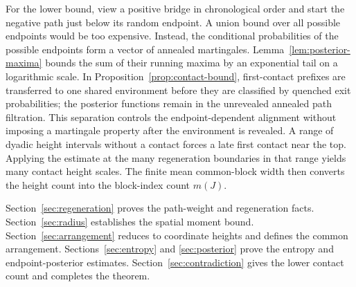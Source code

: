For the lower bound, view a positive bridge in chronological order and
start the negative path just below its random endpoint. A union bound
over all possible endpoints would be too expensive. Instead, the
conditional probabilities of the possible endpoints form a vector of
annealed martingales. Lemma~\ref{lem:posterior-maxima} bounds the sum of
their running maxima by an exponential tail on a logarithmic scale.
In Proposition~\ref{prop:contact-bound}, first-contact prefixes are transferred to
one shared environment before they are classified by quenched exit
probabilities; the posterior functions remain in the unrevealed
annealed path filtration. This separation controls the endpoint-dependent
alignment without imposing a martingale property after the environment
is revealed. A range of dyadic height intervals without a contact forces
a late first contact near the top. Applying the estimate at the many
regeneration boundaries in that range yields many contact height scales.
The finite mean common-block width then converts the height
count into the block-index count $m(J)$.

Section~\ref{sec:regeneration} proves the path-weight and regeneration
facts. Section~\ref{sec:radius} establishes the spatial moment bound.
Section~\ref{sec:arrangement} reduces to coordinate heights and defines
the common arrangement. Sections~\ref{sec:entropy} and
\ref{sec:posterior} prove the entropy and endpoint-posterior estimates.
Section~\ref{sec:contradiction} gives the lower contact count and
completes the theorem.
